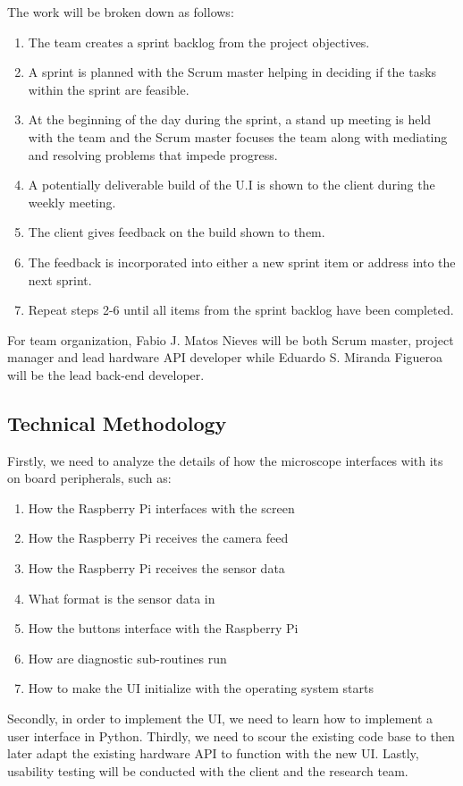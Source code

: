  The work will be broken down as follows:
 \begin{enumerate}
 \item The team creates a sprint backlog from the project objectives.
 \item A sprint is planned with the Scrum master helping in deciding if the tasks within the sprint are feasible.
 \item At the beginning of the day during the sprint, a stand up meeting is held with the team and the Scrum master focuses the team along with mediating and resolving problems that impede progress.
 \item A potentially deliverable build of the U.I is shown to the client during the weekly meeting.
 \item The client gives feedback on the build shown to them.
 \item The feedback is incorporated into either a new sprint item or address into the next sprint.
 \item Repeat steps 2-6 until all items from the sprint backlog have been completed.
 \end{enumerate}
 For team organization, Fabio J. Matos Nieves will be both Scrum master, project manager and lead hardware API developer while Eduardo S. Miranda Figueroa will be the lead back-end developer.
 \subsection{Technical Methodology}
 Firstly, we need to analyze the details of how the microscope interfaces with its on board peripherals, such as:
 \begin{enumerate}
 \item How the Raspberry Pi interfaces with the screen
 \item How the Raspberry Pi receives the camera feed
 \item How the Raspberry Pi receives the sensor data
 \item What format is the sensor data in
 \item How the buttons interface with the Raspberry Pi
 \item How are diagnostic sub-routines run
 \item How to make the UI initialize with the operating system starts
 \end{enumerate}
 Secondly, in order to implement the UI, we need to learn how to implement a user interface in Python. Thirdly, we need to scour the existing code base to then later adapt the existing hardware API to function with the new UI. Lastly, usability testing will be conducted with the client and the research team.
